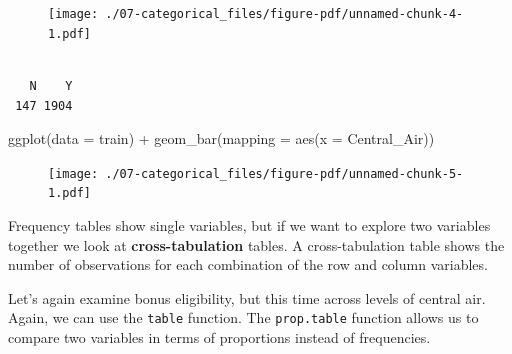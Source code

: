 \documentclass[
  letterpaper,
  DIV=11,
  numbers=noendperiod]{scrreprt}
\newenvironment{Shaded}{\begin{snugshade}}{\end{snugshade}}
\newcommand{\AttributeTok}[1]{\textcolor[rgb]{0.40,0.45,0.13}{#1}}
\newcommand{\FunctionTok}[1]{\textcolor[rgb]{0.28,0.35,0.67}{#1}}
\newcommand{\NormalTok}[1]{\textcolor[rgb]{0.00,0.23,0.31}{#1}}
\newcommand{\SpecialCharTok}[1]{\textcolor[rgb]{0.37,0.37,0.37}{#1}}
\begin{document}
\begin{figure}[H]

{\centering \texttt{[image: ./07-categorical\_files/figure-pdf/unnamed-chunk-4-1.pdf]}

}

\end{figure}

\begin{Shaded}
\end{Shaded}

\begin{verbatim}

   N    Y 
 147 1904 
\end{verbatim}

\begin{Shaded}
\begin{Highlighting}[]
\FunctionTok{ggplot}\NormalTok{(}\AttributeTok{data =}\NormalTok{ train) }\SpecialCharTok{+}
  \FunctionTok{geom\_bar}\NormalTok{(}\AttributeTok{mapping =} \FunctionTok{aes}\NormalTok{(}\AttributeTok{x =}\NormalTok{ Central\_Air))}
\end{Highlighting}
\end{Shaded}

\begin{figure}[H]

{\centering \texttt{[image: ./07-categorical\_files/figure-pdf/unnamed-chunk-5-1.pdf]}

}

\end{figure}

Frequency tables show single variables, but if we want to explore two
variables together we look at \textbf{cross-tabulation} tables. A
cross-tabulation table shows the number of observations for each
combination of the row and column variables.

Let's again examine bonus eligibility, but this time across levels of
central air. Again, we can use the \texttt{table} function. The
\texttt{prop.table} function allows us to compare two variables in terms
of proportions instead of frequencies.

\begin{Shaded}
\end{Shaded}
\end{document}
